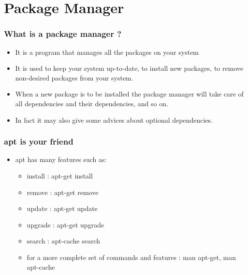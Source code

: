 \section{Package Manager}
\begin{frame}
    \frametitle{What is a package manager ?}
    \begin{itemize}
        \item It is a program that manages all the packages on your system
        \item It is used to keep your system up-to-date, to install new
        packages, to remove non-desired packages from your system.
        \item When a new package is to be installed the package manager will
        take care of all dependencies and their dependencies, and so on.
        \item In fact it may also give some advices about optional
        dependencies.
    \end{itemize}
\end{frame}
\begin{frame}
    \frametitle{apt is your friend}
    \begin{itemize}
        \item apt has many features such as:
        \begin{itemize}
            \item install : apt-get install
            \item remove : apt-get remove
            \item update : apt-get update
            \item upgrade : apt-get upgrade
            \item search : apt-cache search
            \item for a more complete set of commands and features : man
            apt-get, man apt-cache
        \end{itemize}
    \end{itemize}
\end{frame}

